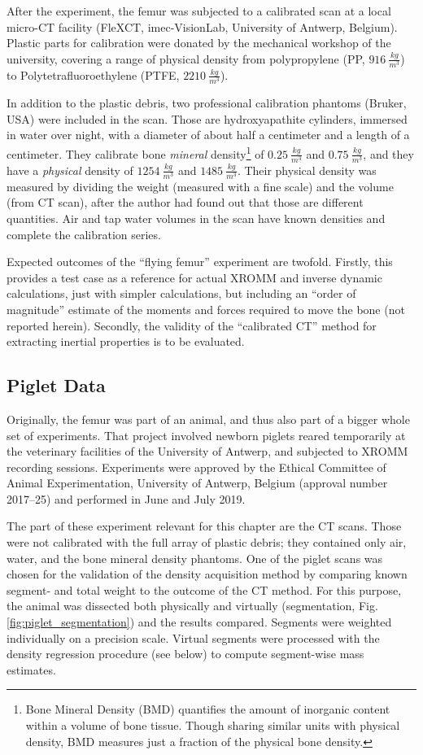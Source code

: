 After the experiment, the femur was subjected to a calibrated scan at a local micro-CT facility (FleXCT, imec-VisionLab, University of Antwerp, Belgium).
Plastic parts for calibration were donated by the mechanical workshop of the university, covering a range of physical density from polypropylene (PP, \(916\ \frac{kg}{m^3}\)) to Polytetrafluoroethylene (PTFE, \(2210\ \frac{kg}{m^3}\)).

In addition to the plastic debris, two professional calibration phantoms (Bruker, USA) were included in the scan.
Those are hydroxyapathite cylinders, immersed in water over night, with a diameter of about half a centimeter and a length of a centimeter.
They calibrate bone \emph{mineral} density\footnote{Bone Mineral Density (BMD) quantifies the amount of inorganic content within a volume of bone tissue. Though sharing similar units with physical density, BMD measures just a fraction of the physical bone density.} of \(0.25\ \frac{kg}{m^3}\) and \(0.75\ \frac{kg}{m^3}\), and they have a \emph{physical} density of \(1254\ \frac{kg}{m^3}\) and \(1485\ \frac{kg}{m^3}\).
Their physical density was measured by dividing the weight (measured with a fine scale) and the volume (from CT scan), after the author had found out that those are different quantities.
Air and tap water volumes in the scan have known densities and complete the calibration series.


Expected outcomes of the ``flying femur'' experiment are twofold.
Firstly, this provides a test case as a reference for actual XROMM and inverse dynamic calculations, just with simpler calculations, but including an ``order of magnitude'' estimate of the moments and forces required to move the bone (not reported herein).
Secondly, the validity of the ``calibrated CT'' method for extracting inertial properties is to be evaluated.


\subsection{Piglet Data}
\label{sec:org5b85920}
Originally, the femur was part of an animal, and thus also part of a bigger whole set of experiments.
That project involved newborn piglets reared temporarily at the veterinary facilities of the University of Antwerp, and subjected to XROMM recording sessions.
Experiments were approved by the Ethical Committee of Animal Experimentation, University of Antwerp, Belgium (approval number 2017–25) and performed in June and July 2019.

The part of these experiment relevant for this chapter are the CT scans.
Those were not calibrated with the full array of plastic debris; they contained only air, water, and the bone mineral density phantoms.
One of the piglet scans was chosen for the validation of the density acquisition method by comparing known segment- and total weight to the outcome of the CT method.
For this purpose, the animal was dissected both physically and virtually (segmentation, Fig. \ref{fig:piglet_segmentation}) and the results compared.
Segments were weighted individually on a precision scale.
Virtual segments were processed with the density regression procedure (see below) to compute segment-wise mass estimates.

